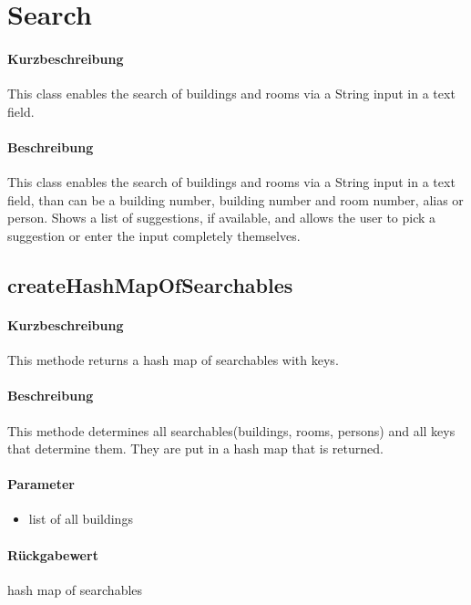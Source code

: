 \section{Search}
\paragraph*{Kurzbeschreibung}
This class enables the search of buildings and rooms via a String input in a text field.
\paragraph*{Beschreibung}
This class enables the search of buildings and rooms via a String input in a text field, 
than can be a building number, building number and room number, alias or person.
Shows a list of suggestions, if available, and allows the user to pick a suggestion or enter the input completely themselves.

\subsection{createHashMapOfSearchables}%
\paragraph*{Kurzbeschreibung}
This methode returns a hash map of searchables with keys.
\paragraph*{Beschreibung}
This methode determines all searchables(buildings, rooms, persons) and all keys that determine them. 
They are put in a hash map that is returned.
\paragraph*{Parameter}
\begin{itemize}
    \item list of all buildings
\end{itemize}
\paragraph*{Rückgabewert}
hash map of searchables